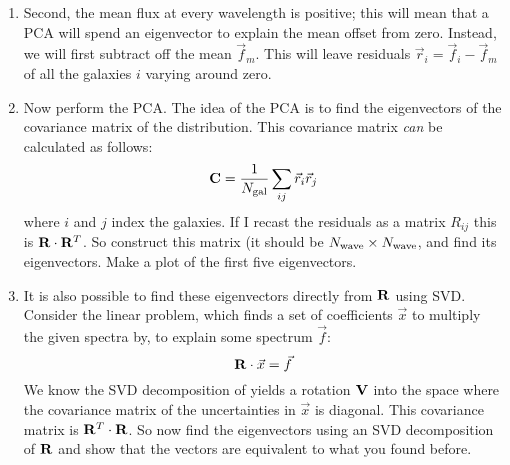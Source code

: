 \documentclass[11pt, preprint]{aastex}
\begin{document}
\begin{enumerate}
\begin{enumerate}
     \item Second, the mean flux at every wavelength is positive; this
       will mean that a PCA will spend an eigenvector to explain the
       mean offset from zero. Instead, we will first subtract off the
       mean $\vec{f}_m$. This will leave residuals $\vec{r}_i =
       \vec{f}_i - \vec{f}_m$ of all the galaxies $i$ varying around
       zero.
     \item Now perform the PCA. The idea of the PCA is to find the
       eigenvectors of the covariance matrix of the distribution. This
       covariance matrix {\it can} be calculated as follows:
       \begin{equation}
         {\bf C} = \frac{1}{N_{\rm gal}} \sum_{ij} \vec{r}_i \vec{r}_j
       \end{equation}
       where $i$ and $j$ index the galaxies. If I recast the residuals
       as a matrix $R_{ij}$ this is ${\bf R}\cdot{\bf R}^T$. So
       construct this matrix (it should be $N_{\rm wave}\times N_{\rm
         wave}$, and find its eigenvectors. Make a plot of the first
       five eigenvectors.
     \item It is also possible to find these eigenvectors directly
       from ${\bf R}$ using SVD. Consider the linear problem, which
       finds a set of coefficients $\vec{x}$ to multiply the given
       spectra by, to explain some spectrum $\vec{f}$:
       \begin{equation}
         {\bf R}\cdot\vec{x} = \vec{f}
       \end{equation}
       We know the SVD decomposition of  yields a rotation
       ${\bf V}$ into the space where the covariance matrix of the
       uncertainties in $\vec{x}$ is diagonal. This covariance matrix
       is ${\bf R}^T\cdot{\bf R}$. So now find the eigenvectors using
       an SVD decomposition of ${\bf R}$ and show that the vectors are
       equivalent to what you found before.
  \end{enumerate}
\end{enumerate}
\end{document}
